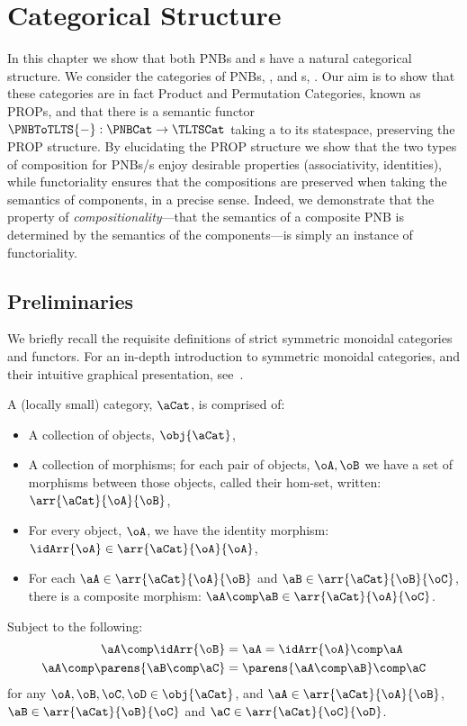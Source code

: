 \chapter{Categorical Structure}\label{chp:catStructure}

In this chapter we show that both PNBs and \TLTS{}s have a natural categorical structure. We
consider the categories of PNBs, \PNBCat, and \TLTS{}s, \TLTSCat. Our aim is to show that these
categories are in fact Product and Permutation Categories, known as PROPs, and that there is a
semantic functor $\PNBToTLTS{-} : \text{\PNBCat} \to \text{\TLTSCat}$ taking a \PNB{} to its
\TLTS{} statespace, preserving the PROP structure. By elucidating the PROP structure we show that
the two types of composition for PNBs/\TLTS{}s enjoy desirable properties (associativity,
identities), while functoriality ensures that the compositions are preserved when taking the
semantics of components, in a precise sense. Indeed, we demonstrate that the property of
\emph{compositionality}---that the semantics of a composite PNB is determined by the semantics of
the components---is simply an instance of functoriality.

\section{Preliminaries}

We briefly recall the requisite definitions of strict symmetric monoidal
categories and functors. For an in-depth introduction to symmetric monoidal
categories, and their intuitive graphical presentation,
see~\cite{Selinger2009}.

\begin{definition}[Category]
    A (locally small) category, $\aCat$, is comprised of:
    \begin{itemize}
        \item A collection of objects, $\obj{\aCat}$,
        \item A collection of morphisms; for each pair of objects, $\oA,
            \oB$ we have a set of morphisms between those objects, called
            their hom-set, written: $\arr{\aCat}{\oA}{\oB}$,
        \item For every object, $\oA$, we have the identity morphism:
            $\idArr{\oA} \in \arr{\aCat}{\oA}{\oA}$,
        \item For each $\aA \in \arr{\aCat}{\oA}{\oB}$ and
            $\aB \in \arr{\aCat}{\oB}{\oC}$, there is a
            composite morphism: $\aA \comp \aB \in
            \arr{\aCat}{\oA}{\oC}$.
    \end{itemize}

    Subject to the following:
    \begin{align*}
        \aA \comp \idArr{\oB} &= \aA = \idArr{\oA} \comp
        \aA \\
        \aA \comp \parens{\aB \comp \aC} &=
        \parens{\aA \comp \aB} \comp \aC
    \end{align*}
    for any $\oA, \oB, \oC, \oD \in \obj{\aCat}$, and
    $\aA \in \arr{\aCat}{\oA}{\oB}$, $\aB \in
    \arr{\aCat}{\oB}{\oC}$ and $\aC \in
    \arr{\aCat}{\oC}{\oD}$.
\end{definition}

